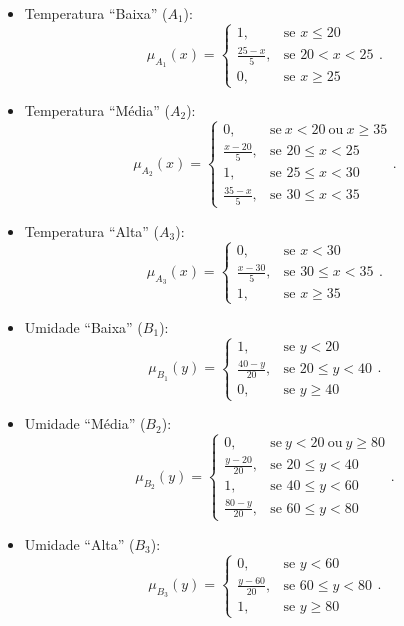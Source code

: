 \begin{itemize}
    \item Temperatura ``Baixa'' ($A_1$): 
    $$
    \mu_{A_1}(x) = \begin{cases} 1, & \text{se } x \leq 20 \\ \frac{25 - x}{5}, & \text{se } 20 < x < 25 \\ 0, & \text{se } x \geq 25 \end{cases}.
    $$
    \item Temperatura ``Média'' ($A_2$):
    $$
    \mu_{A_2}(x) = \begin{cases}
        0, & \text{se} \ x < 20 \ \text{ou} \ x \geq 35 \\ \frac{x - 20}{5}, & \text{se } 20 \leq x < 25 \\ 1, & \text{se } 25 \leq x < 30 \\ \frac{35 - x}{5}, & \text{se } 30 \leq x < 35
    \end{cases}.
    $$
    \item Temperatura ``Alta'' ($A_3$): 
    $$
    \mu_{A_3}(x) = \begin{cases} 0, & \text{se } x < 30 \\ \frac{x - 30}{5}, & \text{se } 30 \leq x < 35 \\ 1, & \text{se } x \geq 35 \end{cases}.
    $$
    
    \item Umidade ``Baixa'' ($B_1$):
    $$\mu_{B_1}(y) = \begin{cases} 1, & \text{se } y <20 \\ \frac{40 - y}{20}, & \text{se } 20 \leq y < 40 \\ 0, & \text{se } y \geq 40 \end{cases}.$$
    \item Umidade ``Média'' ($B_2$): 
    $$\mu_{B_2}(y) = \begin{cases}
    0, & \text{se} \ y < 20 \ \text{ou} \ y \geq 80 \\ \frac{y - 20}{20}, & \text{se } 20 \leq y < 40 \\ 1, & \text{se } 40 \leq y < 60 \\ \frac{80 - y}{20}, & \text{se } 60 \leq y < 80
    \end{cases}.$$
    \item Umidade ``Alta'' ($B_3$):
    $$\mu_{B_3}(y) = \begin{cases} 0, & \text{se } y < 60 \\ \frac{y - 60}{20}, & \text{se } 60 \leq y < 80 \\ 1, & \text{se } y \geq 80 \end{cases}.$$

\end{itemize}

